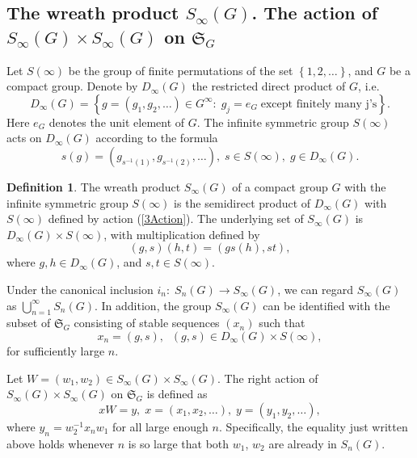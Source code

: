 \documentclass[12pt]{amsart}
\theoremstyle{definition}
\newtheorem{defn}[thm]{Definition}
\numberwithin{equation}{section}
\begin{document}
\subsection{The wreath product $S_{\infty}(G)$. The action of $S_{\infty}(G)\times S_{\infty}(G)$
on $\mathfrak{S}_G$
}\label{SubSectionWreathInfty}
Let $S(\infty)$ be the group of finite permutations of the set $\left\{1,2,\ldots\right\}$, and $G$ be a compact group.
Denote by $D_{\infty}\left(G\right)$ the restricted direct product of $G$, i.e.
$$
D_{\infty}\left(G\right)=\left\{g=\left(g_1,g_2,\ldots\right)\in G^{\infty}:\;g_j=e_{G}\;\mbox{except  finitely many j's}
\right\}.
$$
Here $e_{G}$ denotes the unit element of $G$. The infinite symmetric group $S(\infty)$ acts on
$D_{\infty}\left(G\right)$ according to the formula
\begin{equation}\label{3Action}
s(g)=\left(g_{s^{-1}(1)},g_{s^{-1}(2)},\ldots \right),\; s\in S(\infty),\; g\in D_{\infty}\left(G\right).
\end{equation}
\begin{defn}
The wreath product $S_{\infty}(G)$ of a compact group $G$ with the infinite symmetric group $S(\infty)$ is the semidirect product of $D_{\infty}\left(G\right)$ with $S(\infty)$ defined by action (\ref{3Action}). The underlying set of $S_{\infty}(G)$ is $D_{\infty}\left(G\right)\times S(\infty)$, with multiplication defined by
$$
\left(g,s\right)\left(h,t\right)=\left(gs(h),st\right),
$$
where $g, h\in D_{\infty}\left(G\right)$, and $s, t\in S(\infty)$.
\end{defn}
Under the canonical inclusion $i_n:\; S_{n}(G)\longrightarrow S_{\infty}(G)$, we can regard $S_{\infty}(G)$ as $\bigcup_{n=1}^{\infty}S_n(G)$. In addition, the group $S_{\infty}(G)$ can be identified with the subset of $\mathfrak{S}_{G}$ consisting of stable sequences $\left(x_n\right)$ such that
$$
x_n=\left(g,s\right), \;\; \left(g,s\right)\in D_{\infty}\left(G\right)\times S(\infty),
$$
for sufficiently large $n$.

Let $W=\left(w_1,w_2\right)\in S_{\infty}(G)\times S_{\infty}(G)$. The right action of $S_{\infty}(G)\times S_{\infty}(G)$ on $\mathfrak{S}_{G}$ is defined as
$$
xW=y,\; x=\left(x_1,x_2,\ldots\right),\;y=\left(y_1,y_2,\ldots\right),
$$
where $y_n=w_2^{-1}x_nw_1$ for all large enough $n$. Specifically, the equality just written above holds whenever $n$ is so large that both $w_1$, $w_2$ are already in $S_n(G)$.
\end{document}
